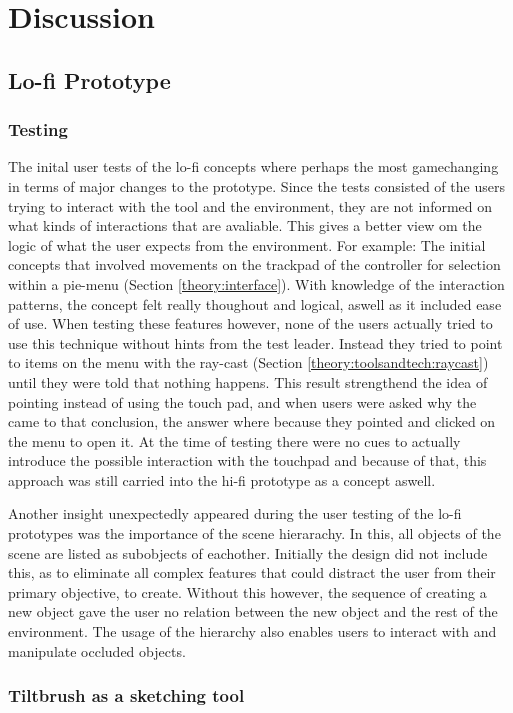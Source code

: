 
\chapter{Discussion}
\section{Lo-fi Prototype}
\subsection{Testing}
The inital user tests of the lo-fi concepts where perhaps the most gamechanging in terms of major changes to the prototype. Since the tests consisted of the users trying to interact with the tool and the environment, they are not informed on what kinds of interactions that are avaliable. This gives a better view om the logic of what the user expects from the environment. For example: The initial concepts that involved movements on the trackpad of the controller for selection within a pie-menu (Section \ref{theory:interface}). With knowledge of the interaction patterns, the concept felt really thoughout and logical, aswell as it included ease of use. When testing these features however, none of the users actually tried to use this technique without hints from the test leader. Instead they tried to point to items on the menu with the ray-cast (Section \ref{theory:toolsandtech:raycast}) until they were told that nothing happens. This result strengthend the idea of pointing instead of using the touch pad, and when users were asked why the came to that conclusion, the answer where because they pointed and clicked on the menu to open it. At the time of testing there were no cues to actually introduce the possible interaction with the touchpad and because of that, this approach was still carried into the hi-fi prototype as a concept aswell.

Another insight unexpectedly appeared during the user testing of the lo-fi prototypes was the importance of the scene hierarachy. In this, all objects of the scene are listed as subobjects of eachother. Initially the design did not include this, as to eliminate all complex features that could distract the user from their primary objective, to create. Without this however, the sequence of creating a new object gave the user no relation between the new object and the rest of the environment. The usage of the hierarchy also enables users to interact with and manipulate occluded objects.

\subsection{Tiltbrush as a sketching tool}

